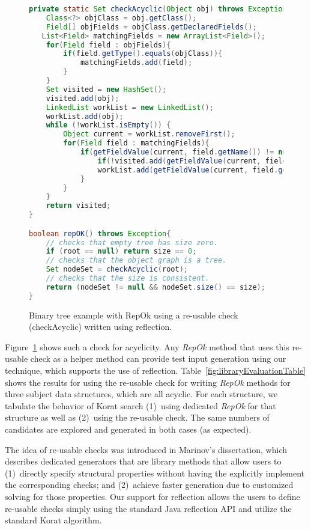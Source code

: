 \begin{figure}
\centering
\begin{lstlisting}[language=Java]
private static Set checkAcyclic(Object obj) throws Exception{
    Class<?> objClass = obj.getClass();
    Field[] objFields = objClass.getDeclaredFields();
   List<Field> matchingFields = new ArrayList<Field>();
    for(Field field : objFields){
        if(field.getType().equals(objClass)){
            matchingFields.add(field);
        }
    }
    Set visited = new HashSet();
    visited.add(obj);
    LinkedList workList = new LinkedList();
    workList.add(obj);
    while (!workList.isEmpty()) {
        Object current = workList.removeFirst();
        for(Field field : matchingFields){
            if(getFieldValue(current, field.getName()) != null){
                if(!visited.add(getFieldValue(current, field.getName()))) return null;
                workList.add(getFieldValue(current, field.getName()));
            }
        }
    }
    return visited;
}

boolean repOK() throws Exception{
    // checks that empty tree has size zero.
    if (root == null) return size == 0;
    // checks that the object graph is a tree.
    Set nodeSet = checkAcyclic(root);
    // checks that the size is consistent.
    return (nodeSet != null && nodeSet.size() == size);
}
\end{lstlisting}
\caption{Binary tree example with RepOk using a re-usable check (checkAcyclic) written using reflection.}
\label{fig:btreeAcyclicRepOk}
\end{figure}

\para
Figure~\ref{fig:btreeAcyclicRepOk} shows such a check for acyclicity.
Any \emph{RepOk} method that uses this re-usable check as a helper method can
provide test input generation using our technique, which supports the
use of reflection.  Table~\ref{fig:libraryEvaluationTable} shows the
results for using the re-usable check for writing \emph{RepOk} methods for
three subject data structures, which are all acyclic.  For each
structure, we tabulate the behavior of Korat search (1)~using
dedicated \emph{RepOk} for that structure as well as (2)~using the re-usable
check.  The same numbers of candidates are explored and generated in
both cases (as expected).

\para
The idea of re-usable checks was introduced in Marinov's dissertation,
which describes dedicated generators that are library methods that
allow users to (1)~directly specify structural properties without
having the explicitly implement the corresponding checks; and
(2)~achieve faster generation due to customized solving for those
properties.  Our support for reflection allows the users to define
re-usable checks simply using the standard Java reflection API and
utilize the standard Korat algorithm.


